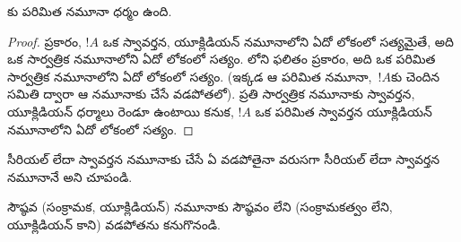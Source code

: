 \documentclass[../../../include/open-logic-section]{subfiles}
\begin{document}
\begin{cor}
  కు పరిమిత నమూనా ధర్మం ఉంది.
\end{cor}

\begin{proof}
   ప్రకారం,
  $!A$ ఒక స్వావర్తన, యూక్లిడియన్ నమూనాలోని
  ఏదో లోకంలో సత్యమైతే, అది ఒక సార్వత్రిక
  నమూనాలోని ఏదో లోకంలో సత్యం. లోని
ఫలితం ప్రకారం, అది ఒక పరిమిత
సార్వత్రిక నమూనాలోని ఏదో లోకంలో సత్యం.
(ఇక్కడ ఆ పరిమిత నమూనా,~$!A$కు చెందిన
   సమితి ద్వారా
  ఆ నమూనాకు చేసే వడపోతలో). ప్రతి సార్వత్రిక
  నమూనాకు స్వావర్తన, యూక్లిడియన్ ధర్మాలు రెండూ ఉంటాయి కనుక,
  $!A$ ఒక పరిమిత స్వావర్తన యూక్లిడియన్ నమూనాలోని
  ఏదో లోకంలో సత్యం.
\end{proof}

\begin{prob}
  సీరియల్ లేదా స్వావర్తన నమూనాకు చేసే ఏ వడపోతైనా
  వరుసగా సీరియల్ లేదా స్వావర్తన నమూనానే అని చూపండి.
\end{prob}

\begin{prob}
  సౌష్ఠవ (సంక్రామక, యూక్లిడియన్) నమూనాకు
  సౌష్ఠవం లేని (సంక్రామకత్వం లేని, యూక్లిడియన్
  కాని) వడపోతను కనుగొనండి.
\end{prob}
\end{document}
